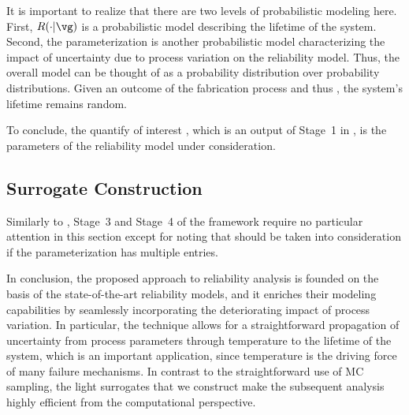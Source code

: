 \begin{remark} 
It is important to realize that there are two levels of probabilistic modeling
here. First, $R(\cdot | \vg)$ \perse is a probabilistic model describing the
lifetime \life of the system. Second, the parameterization \vg is another
probabilistic model characterizing the impact of uncertainty due to process
variation on the reliability model. Thus, the overall model can be thought of as
a probability distribution over probability distributions. Given an outcome of
the fabrication process and thus \vg, the system's lifetime remains random.
\end{remark}

To conclude, the quantify of interest \g, which is an output of Stage~1 in
, is the parameters \vg of the reliability model under
consideration.

\subsection{Surrogate Construction}

Similarly to , Stage~3 and Stage~4 of the
framework require no particular attention in this section except for noting that
 should be taken into consideration if the
parameterization \vg has multiple entries.

\conclusioncut
In conclusion, the proposed approach to reliability analysis is founded on the
basis of the state-of-the-art reliability models, and it enriches their modeling
capabilities by seamlessly incorporating the deteriorating impact of process
variation. In particular, the technique allows for a straightforward propagation
of uncertainty from process parameters through temperature to the lifetime of
the system, which is an important application, since temperature is the driving
force of many failure mechanisms. In contrast to the straightforward use of
\ac{MC} sampling, the light surrogates that we construct make the subsequent
analysis highly efficient from the computational perspective.
